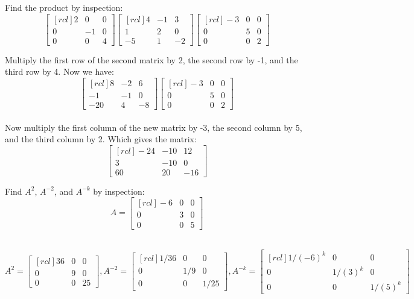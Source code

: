 \ii Find the product by inspection:\\
$$
\begin{bmatrix}[rcl]
2&0&0\\
0&-1&0\\
0&0&4
\end{bmatrix}
\begin{bmatrix}[rcl]
4&-1&3\\
1&2&0\\
-5&1&-2
\end{bmatrix}
\begin{bmatrix}[rcl]
-3&0&0\\
0&5&0\\
0&0&2
\end{bmatrix}$$
\begin{solution}
Multiply the first row of the second matrix by 2, the second row by -1, and the third row by 4. Now we have:\\
$$
\begin{bmatrix}[rcl]
8&-2&6\\
-1&-1&0\\
-20&4&-8
\end{bmatrix}
\begin{bmatrix}[rcl]
-3&0&0\\
0&5&0\\
0&0&2
\end{bmatrix}
$$\\
Now multiply the first column of the new matrix by -3, the second column by 5, and the third column by 2. Which gives the matrix:\\
$$\begin{bmatrix}[rcl]
-24&-10&12\\
3&-10&0\\
60&20&-16
\end{bmatrix}
$$
\end{solution}

\ii Find $A^2$, $A^{-2}$, and $A^{-k}$ by inspection:\\
$$A = 
\begin{bmatrix}[rcl]
-6&0&0\\
0&3&0\\
0&0&5
\end{bmatrix}
$$
\begin{solution}\ \\
$
A^2 = 
\begin{bmatrix}[rcl]
36&0&0\\
0&9&0\\
0&0&25
\end{bmatrix},
A^{-2} =
\begin{bmatrix}[rcl]
1/36&0&0\\
0&1/9&0\\
0&0&1/25
\end{bmatrix},
A^{-k} = 
\begin{bmatrix}[rcl]
1/(-6)^k&0&0\\
0&1/(3)^k&0\\
0&0&1/(5)^k
\end{bmatrix}
$
\end{solution}

